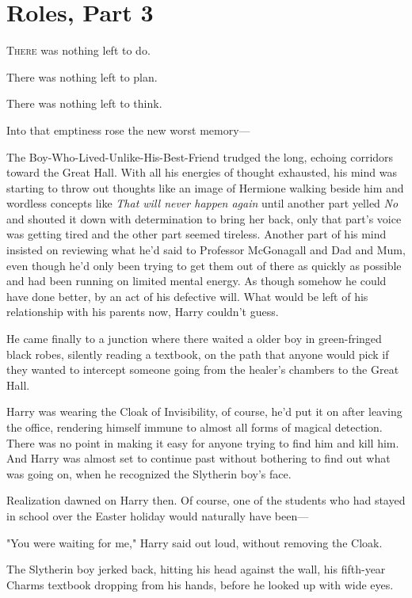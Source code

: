 \chapter{Roles, Part 3}

\lettrine{T}{here} was nothing left to do.

There was nothing left to plan.

There was nothing left to think.

Into that emptiness rose the new worst memory---

The Boy-Who-Lived-Unlike-His-Best-Friend trudged the long, echoing corridors
toward the Great Hall. With all his energies of thought exhausted, his mind was
starting to throw out thoughts like an image of Hermione walking beside him and
wordless concepts like \emph{That will never happen again} until another part
yelled \emph{No} and shouted it down with determination to bring her back, only
that part's voice was getting tired and the other part seemed tireless. Another
part of his mind insisted on reviewing what he'd said to Professor McGonagall
and Dad and Mum, even though he'd only been trying to get them out of there as
quickly as possible and had been running on limited mental energy. As though
somehow he could have done better, by an act of his defective will. What would
be left of his relationship with his parents now, Harry couldn't guess.

He came finally to a junction where there waited a older boy in green-fringed
black robes, silently reading a textbook, on the path that anyone would pick if
they wanted to intercept someone going from the healer's chambers to the Great
Hall.

Harry was wearing the Cloak of Invisibility, of course, he'd put it on after
leaving the office, rendering himself immune to almost all forms of magical
detection. There was no point in making it easy for anyone trying to find him
and kill him. And Harry was almost set to continue past without bothering to
find out what was going on, when he recognized the Slytherin boy's face.

Realization dawned on Harry then. Of course, one of the students who had stayed
in school over the Easter holiday would naturally have been---

"You were waiting for me," Harry said out loud, without removing the Cloak.

The Slytherin boy jerked back, hitting his head against the wall, his
fifth-year Charms textbook dropping from his hands, before he looked up with
wide eyes.


